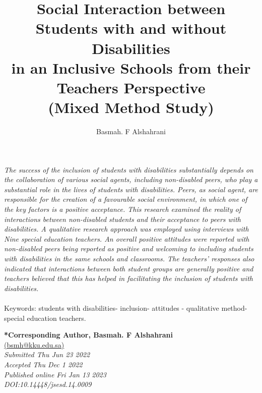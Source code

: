 \documentclass[11.5pt]{sig-alternate}
\makeatletter
\let\oldabstract\abstract
\let\oldendabstract\endabstract
\renewenvironment{abstract}
{\renewenvironment{quotation}%
               {\list{}{\addtolength{\leftmargin}{1em} %
                        \listparindent 1.5em%
                        \itemindent    \listparindent%
                        \rightmargin   \leftmargin%
                        \parsep        \z@ \@plus\p@}%
                \item\relax}%
               {\endlist}%
\oldabstract}
{\oldendabstract}
\makeatother
\begin{document}
\title{Social Interaction between Students with and without Disabilities \\in an Inclusive Schools from their Teachers Perspective \\(Mixed Method Study)}

\author[1]{\large \color{blue} Basmah. F Alshahrani}


\toappear{}

\maketitle
\begin{@twocolumnfalse} 
\begin{abstract}
\begin{large}
\item 
\textit {The success of the inclusion of students with disabilities substantially depends on the collaboration of various social agents, including non-disabled peers, who play a substantial role in the lives of students with disabilities. Peers, as social agent, are responsible for the creation of a favourable social environment, in which one of the key factors is a positive acceptance. This research examined the reality of interactions between non-disabled students and their acceptance to peers with disabilities. A qualitative research approach was employed using interviews with Nine special education teachers. An overall positive attitudes were reported with non-disabled peers being reported as positive and welcoming to including students with disabilities in the same schools and classrooms. The teachers’ responses also indicated that interactions between both student groups are generally positive and teachers believed that this has helped in facilitating the inclusion of students with disabilities. }
     \\
     \\
Keywords: students with disabilities- inclusion- attitudes - qualitative method- special education teachers.
\end{large}
\end{abstract}
\end{@twocolumnfalse}





\textbf{*Corresponding Author, Basmah. F Alshahrani }\\
\href{mailto:bsmh@kku.edu.sa }{(bsmh@kku.edu.sa)} \\
\textit{Submitted  Thu Jun 23 2022}\\
\textit{Accepted Thu Dec 1 2022}\\
\textit{Published online Fri Jan 13 2023}\\
\textit{DOI:10.14448/jsesd.14.0009}\\
\pagebreak
\pagebreak
\end{document}
